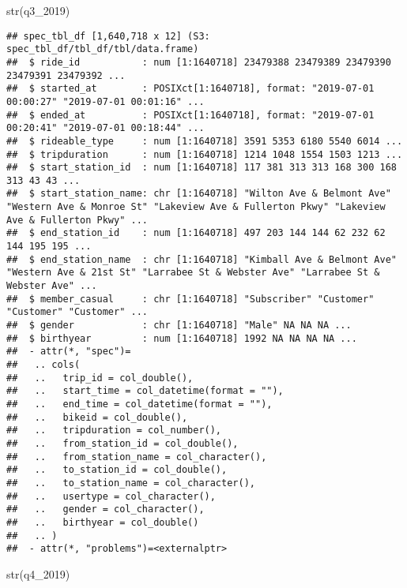 \documentclass[
]{article}
\newenvironment{Shaded}{\begin{snugshade}}{\end{snugshade}}
\newcommand{\FunctionTok}[1]{\textcolor[rgb]{0.00,0.00,0.00}{#1}}
\newcommand{\NormalTok}[1]{#1}
\begin{document}
\begin{Shaded}
\begin{Highlighting}[]
\FunctionTok{str}\NormalTok{(q3\_2019)}
\end{Highlighting}
\end{Shaded}

\begin{verbatim}
## spec_tbl_df [1,640,718 x 12] (S3: spec_tbl_df/tbl_df/tbl/data.frame)
##  $ ride_id           : num [1:1640718] 23479388 23479389 23479390 23479391 23479392 ...
##  $ started_at        : POSIXct[1:1640718], format: "2019-07-01 00:00:27" "2019-07-01 00:01:16" ...
##  $ ended_at          : POSIXct[1:1640718], format: "2019-07-01 00:20:41" "2019-07-01 00:18:44" ...
##  $ rideable_type     : num [1:1640718] 3591 5353 6180 5540 6014 ...
##  $ tripduration      : num [1:1640718] 1214 1048 1554 1503 1213 ...
##  $ start_station_id  : num [1:1640718] 117 381 313 313 168 300 168 313 43 43 ...
##  $ start_station_name: chr [1:1640718] "Wilton Ave & Belmont Ave" "Western Ave & Monroe St" "Lakeview Ave & Fullerton Pkwy" "Lakeview Ave & Fullerton Pkwy" ...
##  $ end_station_id    : num [1:1640718] 497 203 144 144 62 232 62 144 195 195 ...
##  $ end_station_name  : chr [1:1640718] "Kimball Ave & Belmont Ave" "Western Ave & 21st St" "Larrabee St & Webster Ave" "Larrabee St & Webster Ave" ...
##  $ member_casual     : chr [1:1640718] "Subscriber" "Customer" "Customer" "Customer" ...
##  $ gender            : chr [1:1640718] "Male" NA NA NA ...
##  $ birthyear         : num [1:1640718] 1992 NA NA NA NA ...
##  - attr(*, "spec")=
##   .. cols(
##   ..   trip_id = col_double(),
##   ..   start_time = col_datetime(format = ""),
##   ..   end_time = col_datetime(format = ""),
##   ..   bikeid = col_double(),
##   ..   tripduration = col_number(),
##   ..   from_station_id = col_double(),
##   ..   from_station_name = col_character(),
##   ..   to_station_id = col_double(),
##   ..   to_station_name = col_character(),
##   ..   usertype = col_character(),
##   ..   gender = col_character(),
##   ..   birthyear = col_double()
##   .. )
##  - attr(*, "problems")=<externalptr>
\end{verbatim}

\begin{Shaded}
\begin{Highlighting}[]
\FunctionTok{str}\NormalTok{(q4\_2019)}
\end{Highlighting}
\end{Shaded}
\end{document}
